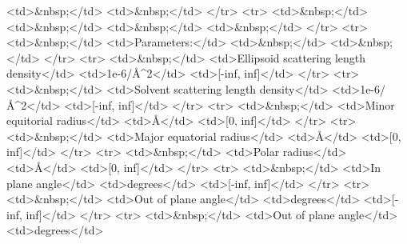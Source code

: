 \textless{}td\textgreater{}\&nbsp;\textless{}/td\textgreater{} \textless{}td\textgreater{}\&nbsp;\textless{}/td\textgreater{} \textless{}/tr\textgreater{} \textless{}tr\textgreater{} \textless{}td\textgreater{}\&nbsp;\textless{}/td\textgreater{} \textless{}td\textgreater{}\&nbsp;\textless{}/td\textgreater{} \textless{}td\textgreater{}\&nbsp;\textless{}/td\textgreater{} \textless{}td\textgreater{}\&nbsp;\textless{}/td\textgreater{} \textless{}/tr\textgreater{} \textless{}tr\textgreater{} \textless{}td\textgreater{}\&nbsp;\textless{}/td\textgreater{} \textless{}td\textgreater{}Parameters:\textless{}/td\textgreater{} \textless{}td\textgreater{}\&nbsp;\textless{}/td\textgreater{} \textless{}td\textgreater{}\&nbsp;\textless{}/td\textgreater{} \textless{}/tr\textgreater{} \textless{}tr\textgreater{} \textless{}td\textgreater{}\&nbsp;\textless{}/td\textgreater{} \textless{}td\textgreater{}Ellipsoid scattering length density\textless{}/td\textgreater{} \textless{}td\textgreater{}1e-6/\AA{}\textasciicircum{}2\textless{}/td\textgreater{} \textless{}td\textgreater{}[-inf, inf]\textless{}/td\textgreater{} \textless{}/tr\textgreater{} \textless{}tr\textgreater{} \textless{}td\textgreater{}\&nbsp;\textless{}/td\textgreater{} \textless{}td\textgreater{}Solvent scattering length density\textless{}/td\textgreater{} \textless{}td\textgreater{}1e-6/\AA{}\textasciicircum{}2\textless{}/td\textgreater{} \textless{}td\textgreater{}[-inf, inf]\textless{}/td\textgreater{} \textless{}/tr\textgreater{} \textless{}tr\textgreater{} \textless{}td\textgreater{}\&nbsp;\textless{}/td\textgreater{} \textless{}td\textgreater{}Minor equitorial radius\textless{}/td\textgreater{} \textless{}td\textgreater{}\AA{}\textless{}/td\textgreater{} \textless{}td\textgreater{}[0, inf]\textless{}/td\textgreater{} \textless{}/tr\textgreater{} \textless{}tr\textgreater{} \textless{}td\textgreater{}\&nbsp;\textless{}/td\textgreater{} \textless{}td\textgreater{}Major equatorial radius\textless{}/td\textgreater{} \textless{}td\textgreater{}\AA{}\textless{}/td\textgreater{} \textless{}td\textgreater{}[0, inf]\textless{}/td\textgreater{} \textless{}/tr\textgreater{} \textless{}tr\textgreater{} \textless{}td\textgreater{}\&nbsp;\textless{}/td\textgreater{} \textless{}td\textgreater{}Polar radius\textless{}/td\textgreater{} \textless{}td\textgreater{}\AA{}\textless{}/td\textgreater{} \textless{}td\textgreater{}[0, inf]\textless{}/td\textgreater{} \textless{}/tr\textgreater{} \textless{}tr\textgreater{} \textless{}td\textgreater{}\&nbsp;\textless{}/td\textgreater{} \textless{}td\textgreater{}In plane angle\textless{}/td\textgreater{} \textless{}td\textgreater{}degrees\textless{}/td\textgreater{} \textless{}td\textgreater{}[-inf, inf]\textless{}/td\textgreater{} \textless{}/tr\textgreater{} \textless{}tr\textgreater{} \textless{}td\textgreater{}\&nbsp;\textless{}/td\textgreater{} \textless{}td\textgreater{}Out of plane angle\textless{}/td\textgreater{} \textless{}td\textgreater{}degrees\textless{}/td\textgreater{} \textless{}td\textgreater{}[-inf, inf]\textless{}/td\textgreater{} \textless{}/tr\textgreater{} \textless{}tr\textgreater{} \textless{}td\textgreater{}\&nbsp;\textless{}/td\textgreater{} \textless{}td\textgreater{}Out of plane angle\textless{}/td\textgreater{} \textless{}td\textgreater{}degrees\textless{}/td\textgreater{} 